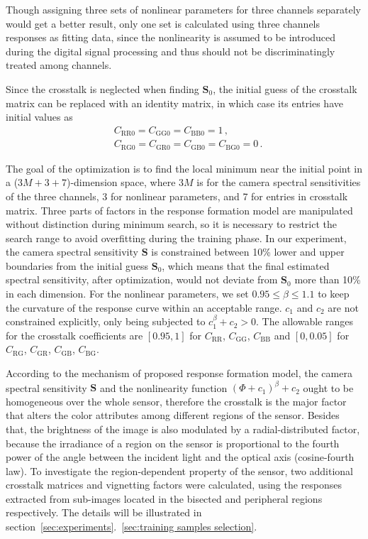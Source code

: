\documentclass[9pt,twocolumn,twoside]{osajnl}
\begin{document}
Though assigning three sets of nonlinear parameters for three channels separately would get a better result, only one set is calculated using three channels responses as fitting data, since the nonlinearity is assumed to be introduced during the digital signal processing and thus should not be discriminatingly treated among channels.

Since the crosstalk is neglected when finding $\mathbf{S}_0$, the initial guess of the crosstalk matrix can be replaced with an identity matrix, in which case its entries have initial values as
\begin{equation}
\begin{split}
& C_{\text{RR}0} = C_{\text{GG}0} = C_{\text{BB}0} = 1\,, \\
& C_{\text{RG}0} = C_{\text{GR}0} = C_{\text{GB}0} = C_{\text{BG}0} = 0\,.
\end{split}
\label{eq:25}
\end{equation}

The goal of the optimization is to find the local minimum near the initial point in a ($3M+3+7$)-dimension space, where $3M$ is for the camera spectral sensitivities of the three channels, 3 for nonlinear parameters, and 7 for entries in crosstalk matrix. Three parts of factors in the response formation model are manipulated without distinction during minimum search, so it is necessary to restrict the search range to avoid overfitting during the training phase. In our experiment, the camera spectral sensitivity $\mathbf{S}$ is constrained between 10\% lower and upper boundaries from the initial guess $\mathbf{S}_0$, which means that the final estimated spectral sensitivity, after optimization, would not deviate from $\mathbf{S}_0$ more than 10\% in each dimension. For the nonlinear parameters, we set $0.95\le\beta\le1.1$ to keep the curvature of the response curve within an acceptable range. $c_1$ and $c_2$ are not constrained explicitly, only being subjected to $c_1^\beta + c_2 > 0$. The allowable ranges for the crosstalk coefficients are $[0.95, 1]$ for $C_\text{RR}$, $C_\text{GG}$, $C_\text{BB}$ and $[0, 0.05]$ for $C_\text{RG}$, $C_\text{GR}$, $C_\text{GB}$, $C_\text{BG}$.

According to the mechanism of proposed response formation model, the camera spectral sensitivity $\mathbf{S}$ and the nonlinearity function $(\Phi + c_1)^\beta + c_2$ ought to be homogeneous over the whole sensor, therefore the crosstalk is the major factor that alters the color attributes among different regions of the sensor. Besides that, the brightness of the image is also modulated by a radial-distributed factor, because the irradiance of a region on the sensor is proportional to the fourth power of the angle between the incident light and the optical axis (cosine-fourth law). To investigate the region-dependent property of the sensor, two additional crosstalk matrices and vignetting factors were calculated, using the responses extracted from sub-images located in the bisected and peripheral regions respectively. The details will be illustrated in section~\ref{sec:experiments}.~\ref{sec:training samples selection}.
\end{document}
